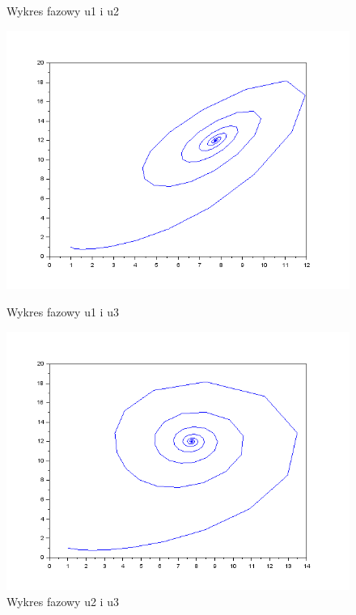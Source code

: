 \documentclass[12pt]{article}
\begin{document}
\begin{center}
\begin{figure}[H]
\begin{minipage}[b]{0.49\textwidth}
    \caption{Wykres fazowy u1 i u2}
  \end{minipage}
\begin{minipage}[b]{0.49\textwidth}
    \includegraphics[scale=0.4]{./img/7-111-phase-1-3}
    \caption{Wykres fazowy u1 i u3}
    \end{minipage}
  \hfill
  \begin{minipage}[b]{0.49\textwidth}
    \includegraphics[scale=0.4]{./img/7-111-phase-2-3}
    \caption{Wykres fazowy u2 i u3}
  \end{minipage}
\end{figure}
\end{center}
\end{document}
